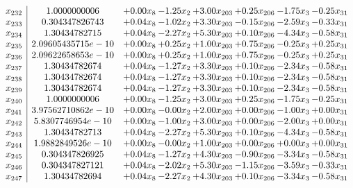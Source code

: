 \documentclass[8pt]{article}
\begin{document}
\[\begin{array}{c| c c@{\hskip 2pt} c@{\hskip 2pt} c@{\hskip 2pt} c@{\hskip 2pt} c@{\hskip 2pt} c@{\hskip 2pt} }
 x_{232}   &  1.0000000006 & +  0.00 x_{8} & -1.25 x_{2} & +  3.00 x_{203} & +  0.25 x_{206} & -1.75 x_{3} & -0.25 x_{31}\\
 x_{233}   &  0.304347826743 & +  0.04 x_{8} & -1.02 x_{2} & +  3.30 x_{203} & -0.15 x_{206} & -2.59 x_{3} & -0.33 x_{31}\\
 x_{234}   &  1.30434782715 & +  0.04 x_{8} & -2.27 x_{2} & +  5.30 x_{203} & +  0.10 x_{206} & -4.34 x_{3} & -0.58 x_{31}\\
 x_{235}   &  2.09605435715e-10 & +  0.00 x_{8} & +  0.25 x_{2} & +  1.00 x_{203} & +  0.75 x_{206} & -0.25 x_{3} & +  0.25 x_{31}\\
 x_{236}   &  2.09622658653e-10 & +  0.00 x_{8} & +  0.25 x_{2} & +  1.00 x_{203} & +  0.75 x_{206} & -0.25 x_{3} & +  0.25 x_{31}\\
 x_{237}   &  1.30434782674 & +  0.04 x_{8} & -1.27 x_{2} & +  3.30 x_{203} & +  0.10 x_{206} & -2.34 x_{3} & -0.58 x_{31}\\
 x_{238}   &  1.30434782674 & +  0.04 x_{8} & -1.27 x_{2} & +  3.30 x_{203} & +  0.10 x_{206} & -2.34 x_{3} & -0.58 x_{31}\\
 x_{239}   &  1.30434782674 & +  0.04 x_{8} & -1.27 x_{2} & +  3.30 x_{203} & +  0.10 x_{206} & -2.34 x_{3} & -0.58 x_{31}\\
 x_{240}   &  1.0000000006 & +  0.00 x_{8} & -1.25 x_{2} & +  3.00 x_{203} & +  0.25 x_{206} & -1.75 x_{3} & -0.25 x_{31}\\
 x_{241}   &  3.97562710862e-10 & +  0.00 x_{8} & -0.00 x_{2} & +  2.00 x_{203} & +  0.00 x_{206} & -1.00 x_{3} & +  0.00 x_{31}\\
 x_{242}   &  5.8307746954e-10 & +  0.00 x_{8} & -1.00 x_{2} & +  3.00 x_{203} & +  0.00 x_{206} & -2.00 x_{3} & +  0.00 x_{31}\\
 x_{243}   &  1.30434782713 & +  0.04 x_{8} & -2.27 x_{2} & +  5.30 x_{203} & +  0.10 x_{206} & -4.34 x_{3} & -0.58 x_{31}\\
 x_{244}   &  1.9882849526e-10 & +  0.00 x_{8} & -0.00 x_{2} & +  1.00 x_{203} & +  0.00 x_{206} & +  0.00 x_{3} & +  0.00 x_{31}\\
 x_{245}   &  0.304347826925 & +  0.04 x_{8} & -1.27 x_{2} & +  4.30 x_{203} & -0.90 x_{206} & -3.34 x_{3} & -0.58 x_{31}\\
 x_{246}   &  0.304347827121 & +  0.04 x_{8} & -2.02 x_{2} & +  5.30 x_{203} & -1.15 x_{206} & -3.59 x_{3} & -0.33 x_{31}\\
 x_{247}   &  1.30434782694 & +  0.04 x_{8} & -2.27 x_{2} & +  4.30 x_{203} & +  0.10 x_{206} & -3.34 x_{3} & -0.58 x_{31}\\

\end{array}\]
\end{document}
